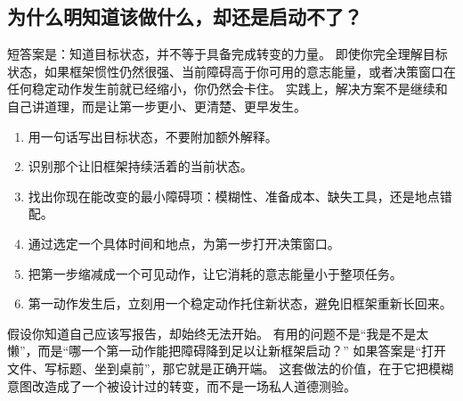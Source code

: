 \subsection{为什么明知道该做什么，却还是启动不了？}

短答案是：知道目标状态，并不等于具备完成转变的力量。
即使你完全理解目标状态，如果框架惯性仍然很强、当前障碍高于你可用的意志能量，或者决策窗口在任何稳定动作发生前就已经缩小，你仍然会卡住。
实践上，解决方案不是继续和自己讲道理，而是让第一步更小、更清楚、更早发生。

\begin{enumerate}[nosep]
  \item 用一句话写出目标状态，不要附加额外解释。
  \item 识别那个让旧框架持续活着的当前状态。
  \item 找出你现在能改变的最小障碍项：模糊性、准备成本、缺失工具，还是地点错配。
  \item 通过选定一个具体时间和地点，为第一步打开决策窗口。
  \item 把第一步缩减成一个可见动作，让它消耗的意志能量小于整项任务。
  \item 第一动作发生后，立刻用一个稳定动作托住新状态，避免旧框架重新长回来。
\end{enumerate}

\begin{remark}
假设你知道自己应该写报告，却始终无法开始。
有用的问题不是“我是不是太懒”，而是“哪一个第一动作能把障碍降到足以让新框架启动？”
如果答案是“打开文件、写标题、坐到桌前”，那它就是正确开端。
这套做法的价值，在于它把模糊意图改造成了一个被设计过的转变，而不是一场私人道德测验。
\end{remark}